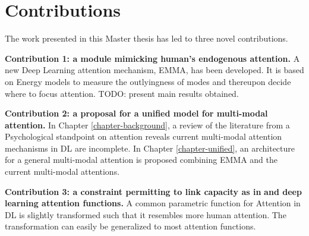 
\section{Contributions}
The work presented in this Master thesis has led to three novel contributions.
\begin{description}
\item \textbf{Contribution 1: a module mimicking human's endogenous attention.} A new Deep Learning attention mechanism, EMMA, has been developed. It is based on Energy models \citep{EBM} to measure the outlyingness of modes and thereupon decide where to focus attention. TODO: present main results obtained.
\item \textbf{Contribution 2: a proposal for a unified model for multi-modal attention.} In Chapter \ref{chapter-background}, a review of the literature from a Psychological standpoint on attention reveals current multi-modal attention mechanisms in DL are incomplete. In Chapter \ref{chapter-unified}, an architecture for a general multi-modal attention is proposed combining EMMA and the current multi-modal attentions.
\item \textbf{Contribution 3: a constraint permitting to link capacity as in} \citep{attention-is-effort} \textbf{and deep learning attention functions.} A common parametric function for Attention in DL is slightly transformed such that it resembles more human attention. The transformation can easily be generalized to most attention functions.
\end{description}


